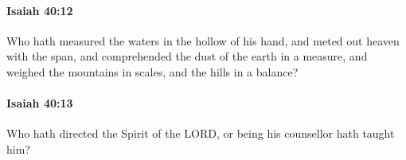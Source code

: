 		\paragraph{Isaiah 40:12} %
			\label{ISAIAH-40-12}

			Who hath measured the waters in the hollow of his hand, and meted out heaven with the span, and comprehended the dust of the earth in a measure, and weighed the mountains in scales, and the hills in a balance?


		\paragraph{Isaiah 40:13} %
			\label{ISAIAH-40-13}

			Who hath directed the Spirit of the LORD, or being his counsellor hath taught him?


